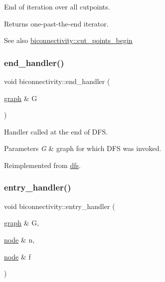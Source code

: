 End of iteration over all cutpoints. 

\begin{DoxyReturn}{Returns}
one-\/past-\/the-\/end iterator. 
\end{DoxyReturn}
\begin{DoxySeeAlso}{See also}
\mbox{\hyperlink{classbiconnectivity_a473197552874aaf148e847838144eed7}{biconnectivity\+::cut\+\_\+points\+\_\+begin}} 
\end{DoxySeeAlso}
\mbox{\label{classbiconnectivity_a2583331a4561f3db221ab674d2e5d75e}} 
\subsubsection{\texorpdfstring{end\+\_\+handler()}{end\_handler()}}
{\footnotesize\ttfamily void biconnectivity\+::end\+\_\+handler (\begin{DoxyParamCaption}\item[{\mbox{\hyperlink{classgraph}{graph}} \&}]{G }\end{DoxyParamCaption})\hspace{0.3cm}{\ttfamily [virtual]}}



Handler called at the end of D\+FS. 


\begin{DoxyParams}{Parameters}
{\em G} & graph for which D\+FS was invoked. \\
\hline
\end{DoxyParams}


Reimplemented from \mbox{\hyperlink{classdfs_ab96c7c6183856dd9e356fdcf50835b32}{dfs}}.

\mbox{\label{classbiconnectivity_acb402f2d144f84429b3cd009121245b0}} 
\subsubsection{\texorpdfstring{entry\+\_\+handler()}{entry\_handler()}}
{\footnotesize\ttfamily void biconnectivity\+::entry\+\_\+handler (\begin{DoxyParamCaption}\item[{\mbox{\hyperlink{classgraph}{graph}} \&}]{G,  }\item[{\mbox{\hyperlink{classnode}{node}} \&}]{n,  }\item[{\mbox{\hyperlink{classnode}{node}} \&}]{f }\end{DoxyParamCaption})\hspace{0.3cm}{\ttfamily [virtual]}}



